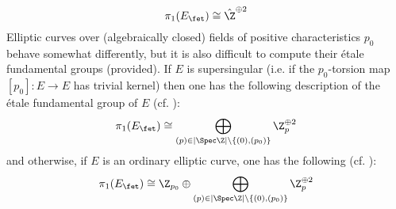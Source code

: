 \begin{example}
\begin{itemize}
                        $$\pi_1(E_{\fet}) \cong \hat{\Z}^{\oplus 2}$$
                    Elliptic curves over (algebraically closed) fields of positive characteristics $p_0$ behave somewhat differently, but it is also difficult to compute their \'etale fundamental groups (provided). If $E$ is supersingular (i.e. if the $p_0$-torsion map $[p_0]: E \to E$ has trivial kernel) then one has the following description of the \'etale fundamental group of $E$ (cf. \cite[Proposition 5.13]{kundu_etale_fundamental_group_of_elliptic_curves}):
                        $$\pi_1(E_{\fet}) \cong \bigoplus_{(p) \in |\Spec \Z| \setminus \{(0), (p_0)\}} \Z_p^{\oplus 2}$$
                    and otherwise, if $E$ is an ordinary elliptic curve, one has the following (cf. \cite[Proposition 5.14]{kundu_etale_fundamental_group_of_elliptic_curves}):
                        $$\pi_1(E_{\fet}) \cong \Z_{p_0} \oplus \bigoplus_{(p) \in |\Spec \Z| \setminus \{(0), (p_0)\}} \Z_p^{\oplus 2}$$
                \end{itemize}
            \end{example}
        
